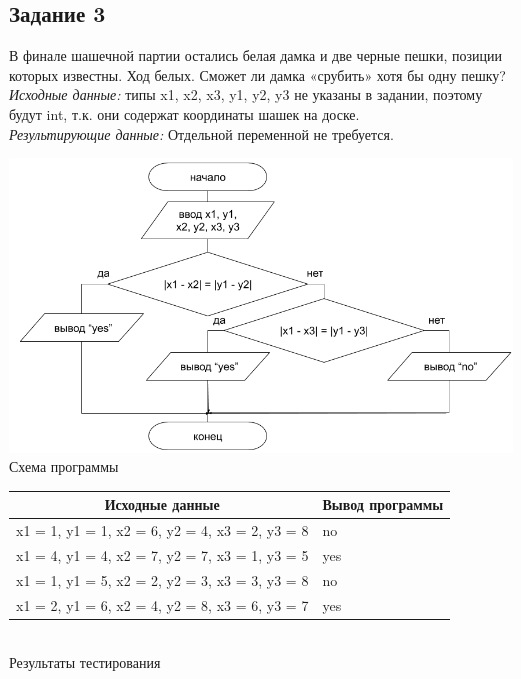 \documentclass[a4paper,14pt]{extarticle}
\begin{document}
\subsection{Задание 3}
В финале шашечной партии остались белая дамка и две черные пешки, позиции которых известны. Ход белых. Сможет ли дамка «срубить» хотя бы одну пешку?\\
\textit{Исходные данные:} типы x1, x2, x3, y1, y2, y3 не указаны в задании, поэтому будут int, т.к. они содержат координаты шашек на доске.\\
\textit{Результирующие данные:} Отдельной переменной не требуется.\\
\begin{center}
\includegraphics[scale=0.6]{lab2-3.png}\\
Схема программы
\end{center}

\begin{center}
\begin{tabular}{|l|l|}
\hline
\multicolumn{1}{|c|}{Исходные данные}& \multicolumn{1}{|c|}{Вывод программы}\\
\hline
x1 = 1, y1 = 1, x2 = 6, y2 = 4, x3 = 2, y3 = 8 & no\\
x1 = 4, y1 = 4, x2 = 7, y2 = 7, x3 = 1, y3 = 5 & yes\\
x1 = 1, y1 = 5, x2 = 2, y2 = 3, x3 = 3, y3 = 8 & no\\
x1 = 2, y1 = 6, x2 = 4, y2 = 8, x3 = 6, y3 = 7 & yes\\
\hline
\end{tabular}\\
\vspace{0.3cm}
Результаты тестирования
\end{center}
\end{document}
